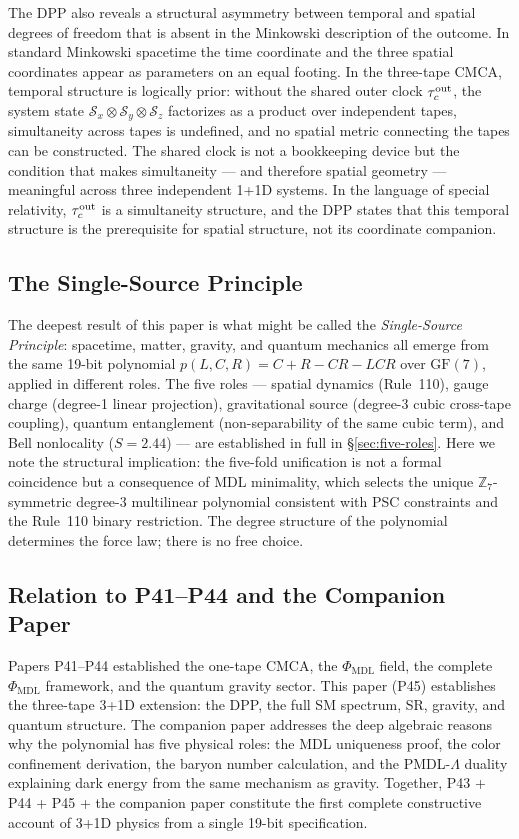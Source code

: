 \documentclass[11pt]{article}
\theoremstyle{remark}
\newcommand{\PHIMDL}{\Phi_{\mathrm{MDL}}}
\newcommand{\ZS}{\mathbb{Z}_7}
\newcommand{\CMCA}{\text{CMCA}}
\newcommand{\taucout}{\tau_c^{\rm out}}
\newcommand{\FF}{\mathrm{GF}}
\begin{document}
The DPP also reveals a structural asymmetry between temporal and spatial
degrees of freedom that is absent in the Minkowski description of the
outcome. In standard Minkowski spacetime the time coordinate and the three
spatial coordinates appear as parameters on an equal footing. In the
three-tape $\CMCA$, temporal structure is logically prior: without the
shared outer clock $\taucout$, the system state
$\mathcal{S}_x \otimes \mathcal{S}_y \otimes \mathcal{S}_z$ factorizes as
a product over independent tapes, simultaneity across tapes is undefined,
and no spatial metric connecting the tapes can be constructed.
The shared clock is not a bookkeeping device but the condition that makes
simultaneity --- and therefore spatial geometry --- meaningful across three
independent 1+1D systems. In the language of special relativity,
$\taucout$ is a simultaneity structure, and the DPP states that this
temporal structure is the prerequisite for spatial structure, not its
coordinate companion.

\subsection{The Single-Source Principle}

The deepest result of this paper is what might be called the
\emph{Single-Source Principle}: spacetime, matter, gravity, and
quantum mechanics all emerge from the same 19-bit polynomial
$p(L,C,R) = C+R-CR-LCR$ over $\FF(7)$, applied in different roles.
The five roles — spatial dynamics (Rule~110), gauge charge
(degree-1 linear projection), gravitational source (degree-3 cubic
cross-tape coupling), quantum entanglement (non-separability of the
same cubic term), and Bell nonlocality ($S = 2.44$) — are established
in full in \S\ref{sec:five-roles}.  Here we note the structural
implication: the five-fold unification is not a formal coincidence
but a consequence of MDL minimality, which selects the unique
$\ZS$-symmetric degree-3 multilinear polynomial consistent with
PSC constraints and the Rule~110 binary restriction.  The degree
structure of the polynomial determines the force law; there is no
free choice.

\subsection{Relation to P41--P44 and the Companion Paper}

Papers P41--P44 established the one-tape $\CMCA$, the $\PHIMDL$ field, the
complete $\PHIMDL$ framework, and the quantum gravity sector. This paper
(P45) establishes the three-tape 3+1D extension: the DPP, the full SM
spectrum, SR, gravity, and quantum structure. The companion paper addresses
the deep algebraic reasons why the polynomial has five physical roles: the
MDL uniqueness proof, the color confinement derivation, the baryon number
calculation, and the PMDL-$\Lambda$ duality explaining dark energy from the
same mechanism as gravity. Together, P43 + P44 + P45 + the companion paper
constitute the first complete constructive account of 3+1D physics from a
single 19-bit specification.
\end{document}
